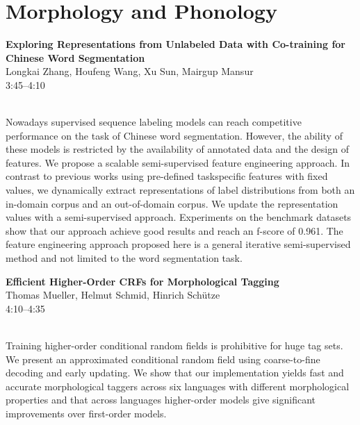 \documentclass[twoside,makeidx]{book}
\begin{document}
\section{Morphology and Phonology}
\vspace{-1em}
\par\vspace{2em}\noindent%
\begin{minipage}{\linewidth}%
\begin{center}
\textbf{\normalsize Exploring Representations from Unlabeled Data with Co-training for Chinese Word Segmentation}\\
\normalsize  Longkai Zhang,  Houfeng Wang,  Xu Sun,  Mairgup Mansur\\
{\small 3:45--4:10}\\
\end{center}
\end{minipage}\\[0.5em]
\nopagebreak%
\noindent%
{\small Nowadays supervised sequence labeling models can reach competitive performance on the task of Chinese word segmentation. However, the ability of these models is restricted by the availability of annotated data and the design of features. We propose a scalable semi-supervised feature engineering approach. In contrast to previous works using pre-defined taskspecific features with fixed values, we dynamically extract representations of label distributions from both an in-domain corpus and an out-of-domain corpus. We update the representation values with a semi-supervised approach. Experiments on the benchmark datasets show that our approach achieve good results and reach an f-score of 0.961. The feature engineering approach proposed here is a general iterative semi-supervised method and not limited to the word segmentation task.}
\par\vspace{2em}\noindent%
\begin{minipage}{\linewidth}%
\begin{center}
\textbf{\normalsize Efficient Higher-Order CRFs for Morphological Tagging}\\
\normalsize  Thomas Mueller,  Helmut Schmid,  Hinrich Sch\"{u}tze\\
{\small 4:10--4:35}\\
\end{center}
\end{minipage}\\[0.5em]
\nopagebreak%
\noindent%
{\small Training higher-order conditional random fields is prohibitive for huge tag sets. We present an approximated conditional random field using coarse-to-fine decoding and early updating. We show that our implementation yields fast and accurate morphological taggers across six languages with different morphological properties and that across languages higher-order models give significant improvements over first-order models.}
\end{document}
